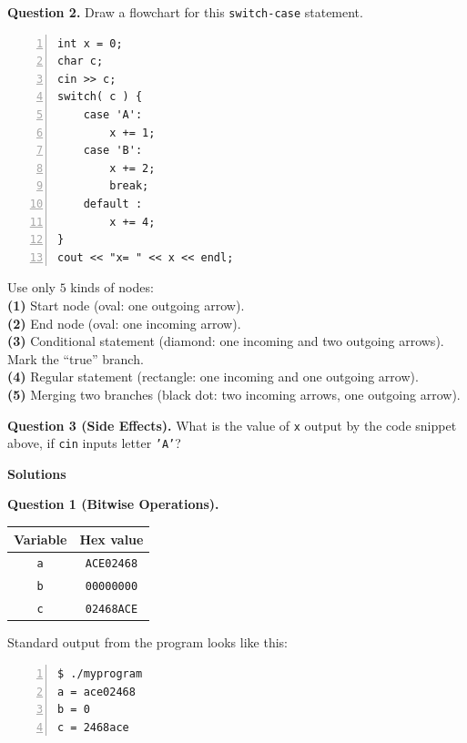 \documentclass[11pt]{article}
\begin{document}
\vspace{20pt}
{\bf Question 2.} 
Draw a flowchart for this {\tt switch-case} statement.

\begin{center}
\begin{minipage}{.8\columnwidth}
\begin{Verbatim}[frame=single,numbers=left]
int x = 0;
char c; 
cin >> c; 
switch( c ) {
    case 'A':
        x += 1;
    case 'B':
        x += 2;
        break;
    default :
        x += 4;
}
cout << "x= " << x << endl;
\end{Verbatim}
\end{minipage}
\end{center}



Use only $5$ kinds of nodes:\\
{\footnotesize
{\bf (1)} Start node (oval: one outgoing arrow).\\
{\bf (2)} End node (oval: one incoming arrow).\\
{\bf (3)} Conditional statement (diamond: one incoming and two outgoing arrows). Mark the ``true'' branch.\\
{\bf (4)} Regular statement (rectangle: one incoming and one outgoing arrow).\\
{\bf (5)} Merging two branches (black dot: two incoming arrows, one outgoing arrow).
}



\vspace{20pt}
{\bf Question 3 (Side Effects).}
What is the value of {\tt x} output by the code snippet above, 
if {\tt cin} inputs letter {\tt 'A'}?


\newpage
{\bf \LARGE Solutions}

\vspace{10pt}
{\bf Question 1 (Bitwise Operations).} 

\begin{tabular}{|c|c|} \hline
{\bf Variable} & {\bf Hex value} \\ \hline
{\tt a} & {\tt ACE02468}  \\ \hline
{\tt b} & {\tt 00000000} \\ \hline
{\tt c} & {\tt 02468ACE} \\ \hline
\end{tabular}

Standard output from the program looks like this:

\begin{Verbatim}[frame=single,numbers=left]
$ ./myprogram
a = ace02468
b = 0
c = 2468ace
\end{Verbatim}
\end{document}
